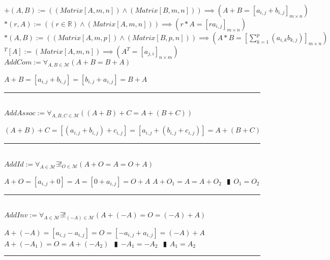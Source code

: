 \documentclass{book}
\newcommand{\abr}{:=}
\newcommand{\pipe}{$\phantom{(}\vrectangleblack\phantom{)}$}
\newcommand{\pr}[1]{\left(#1\right)}
\begin{document}
$+(A, B) \abr \pr{(Matrix[A, m, n]) \land (Matrix[B, m, n])} \implies (A + B = [a_{i, j} + b_{i, j}]_{m \times n}) $ \\
$*(r, A) \abr \pr{(r \in \mathbb{R}) \land (Matrix[A, m, n])} \implies (r * A = [r a_{i, j}]_{m \times n})$ \\
$*(A, B) \abr \pr{(Matrix[A, m, p]) \land (Matrix[B, p, n])} \implies \pr{A * B = \left[\sum_{k = 1}^{p}(a_{i, k} b_{k, j})\right]_{m \times n}}$ \\
$\phantom{ }^T[A] \abr (Matrix[A, m, n]) \implies (A^T = [a_{j, i}]_{n \times m})$ \\

$AddCom \abr \forall_{A, B \in \mathcal{M}}(A + B = B + A)$
\begin{enumerate}
  \lit $A + B = [a_{i, j} + b_{i, j}] = [b_{i, j} + a_{i, j}] = B + A$
\end{enumerate} \vspace{.75mm} \hrule \vspace{.75mm} \ \\

$AddAssoc \abr \forall_{A, B, C \in \mathcal{M}}\pr{(A + B) + C = A + (B + C)}$
\begin{enumerate}
  \lit $(A + B) + C = [(a_{i, j} + b_{i, j}) + c_{i, j}] = [a_{i, j} + (b_{i, j} + c_{i, j})] = A + (B + C)$
\end{enumerate} \vspace{.75mm} \hrule \vspace{.75mm} \ \\

$AddId \abr \forall_{A \in \mathcal{M}} \exists!_{O \in \mathcal{M}}(A + O = A = O + A)$
\begin{enumerate}
  \lit $A + O = [a_{i, j} + 0] = A = [0 + a_{i, j}] = O + A$
  \lit $A + O_1 = A = A + O_2$ \pipe $O_1 = O_2$
\end{enumerate} \vspace{.75mm} \hrule \vspace{.75mm} \ \\

$AddInv \abr \forall_{A \in \mathcal{M}} \exists!_{(-A) \in \mathcal{M}}\pr{A + (-A) = O = (-A) + A}$
\begin{enumerate}
  \lit $A + (-A) = [a_{i, j} - a_{i, j}] = O = [-a_{i, j} + a_{i, j}] = (-A) + A$
  \lit $A + (-A_1) = O = A + (-A_2)$ \pipe $-A_1 = -A_2$ \pipe $A_1 = A_2$
\end{enumerate} \vspace{.75mm} \hrule \vspace{.75mm} \ \\ 
\end{document}
